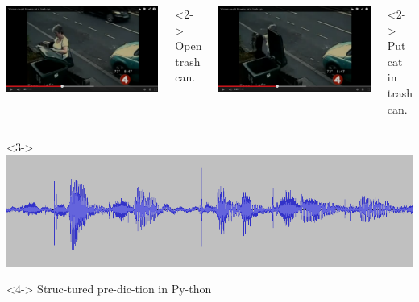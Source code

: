 \documentclass[final,ignorenonframetext,compress]{beamer}
\begin{document}
\begin{frame}
\begin{columns}[t]
        \includegraphics[width=\linewidth]{images/open_trash_can}\\
        \begin{visibleenv}<2->
            \tiny{Open trash can.}
        \end{visibleenv}

        \includegraphics[width=\linewidth]{images/cat_in_trashcan}\\
        \begin{visibleenv}<2->
            \tiny{Put cat in trash can.}
        \end{visibleenv}
    \end{columns}
\vspace{5mm}
\begin{center}
\begin{visibleenv}<3->
        \includegraphics[width=.8\linewidth]{images/speech}\\
\end{visibleenv}
\begin{visibleenv}<4->
            Struc-tured pre-dic-tion in Py-thon
\end{visibleenv}
\end{center}
\end{frame}
\end{document}
